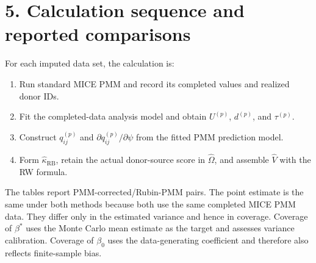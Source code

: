 \documentclass[11pt]{article}
\begin{document}
\section*{5. Calculation sequence and reported comparisons}
For each imputed data set, the calculation is:
\begin{enumerate}
\item Run standard MICE PMM and record its completed values and realized donor IDs.
\item Fit the completed-data analysis model and obtain $U^{(p)}$, $d^{(p)}$, and $\tau^{(p)}$.
\item Construct $q_{ij}^{(p)}$ and $\partial q_{ij}^{(p)}/\partial\psi$ from the fitted PMM prediction model.
\item Form $\widehat{\kappa}_{\mathrm{RB}}$, retain the actual donor-source score in $\widehat{\Omega}$, and assemble $\widehat V$ with the RW formula.
\end{enumerate}
The tables report PMM-corrected/Rubin-PMM pairs. The point estimate is the same under both methods because both use the same completed MICE PMM data. They differ only in the estimated variance and hence in coverage. Coverage of $\beta^\ast$ uses the Monte Carlo mean estimate as the target and assesses variance calibration. Coverage of $\beta_0$ uses the data-generating coefficient and therefore also reflects finite-sample bias.
\end{document}
